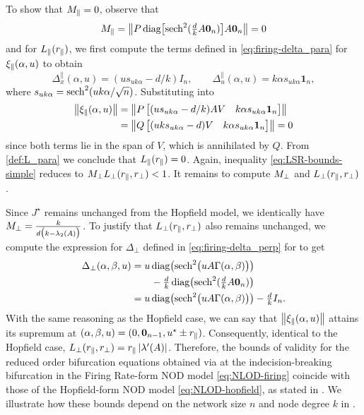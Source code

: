 \documentclass[letterpaper, 10 pt, conference]{ieeeconf}
\begin{document}
To show that \(M_{\parallel} = 0\), observe that
\begin{equation*}
    M_{\parallel} = \left\lVert{P \operatorname{diag}\bigl[\operatorname{sech}^2(\tfrac{d}{k}A\mathbf{0}_{n})\bigr]A\mathbf{0}_{n}}\right\rVert = 0
\end{equation*}
and for \(L_{\parallel}(r_{\parallel})\), we first compute the terms defined in \eqref{eq:firing-delta_para} for \(\xi_{\parallel}(\alpha,u)\) to obtain
\begin{equation*}
    \Delta_{x}^{\parallel}(\alpha,u) = (us_{uk\alpha} - d/k)I_n, \qquad \Delta_{u}^{\parallel}(\alpha,u) = k \alpha s_{uk\alpha} \mathbf{1}_{n},
\end{equation*}
where \(s_{uk\alpha} = \operatorname{sech}^2(uk\alpha/\sqrt{n})\). Substituting into 
\begin{align*}
    \left\lVert{\ensuremath{\xi_{\parallel}(\alpha,u)}}\right\rVert & = \left\lVert{P \begin{bmatrix} (u s_{uk\alpha} - d/k) A V & k \alpha s_{uk\alpha} \mathbf{1}_{n} \end{bmatrix}}\right\rVert   \\
                    & = \left\lVert{Q \begin{bmatrix} (u k s_{uk\alpha} - d) V & k \alpha s_{uk\alpha} \mathbf{1}_{n} \end{bmatrix}}\right\rVert = 0
\end{align*}
since both terms lie in the span of \(V\), which is annihilated by \(Q\). From \eqref{def:L_para} we conclude that \(L_{\parallel}(r_{\parallel}) = 0\).
Again, inequality \eqref{eq:LSR-bounds-simple} reduces to \(M_{\perp} L_{\perp}(r_{\parallel},r_{\perp}) < 1\). It remains to compute \(M_{\perp}\) and \(L_{\perp}(r_{\parallel},r_{\perp})\).

Since \(J^{\star}\) remains unchanged from the Hopfield model, we identically have \(M_{\perp} = \frac{k}{d\big(k - \lambda_{2}(A)\big)}\).
To justify that \(L_{\perp}(r_{\parallel},r_{\perp})\) also remains unchanged, we compute the expression for \(\Delta_{\perp}\) defined in \eqref{eq:firing-delta_perp} for  to get
\begin{align*}
    \Delta_{\perp}(\alpha,\beta,u) & = u\operatorname{diag}\bigl(\operatorname{sech}^2\bigl(uA\Gamma(\alpha,\beta)\bigr)\bigr)                      \\
                                   & \qquad - \tfrac{d}{k}\operatorname{diag}\bigl(\operatorname{sech}^2(\tfrac{d}{k}A\mathbf{0}_{n})\bigr)         \\
                                   & = u\operatorname{diag}\bigl(\operatorname{sech}^2\bigl(uA\Gamma(\alpha,\beta)\bigr)\bigr) - \tfrac{d}{k}I_{n}.
\end{align*}
With the same reasoning as the Hopfield case, we can say that \(\left\lVert{\ensuremath{\xi_{\parallel}(\alpha,u)}}\right\rVert\) attains its supremum at \((\alpha,\beta,u) = (0, \mathbf{0}_{n-1}, u^{\star} \pm r_{\parallel})\).
Consequently, identical to the Hopfield case, \(L_{\perp}(r_{\parallel},r_{\perp}) = r_{\parallel}\left\lvert{\lambda'(A)}\right\rvert\). Therefore, the bounds of validity for the reduced order bifurcation equations obtained via \LSR{} at the indecision-breaking bifurcation in the Firing Rate-form NOD model \eqref{eq:NLOD-firing} coincide with those of the Hopfield-form NOD model \eqref{eq:NLOD-hopfield}, as stated in . We illustrate how these bounds depend on the network size \(n\) and node degree \(k\) in .
\end{document}
